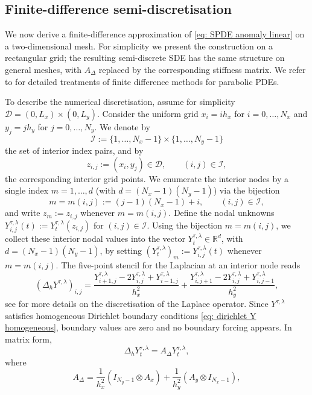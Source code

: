 \documentclass[10pt]{amsart}
\numberwithin{equation}{section}
\begin{document}
\subsection{Finite-difference semi-discretisation}
\label{subsec: fd anomaly}

We now derive a finite-difference approximation of \eqref{eq: SPDE anomaly linear} on a two-dimensional mesh.
For simplicity we present the construction on a rectangular grid; the resulting semi-discrete SDE has the same
structure on general meshes, with $A_\Delta$ replaced by the corresponding stiffness matrix. We refer to \cite{Quarteroni,Leveque} for detailed treatments of finite difference methods for parabolic PDEs.


To describe the numerical discretisation, assume for simplicity $\mathcal D=(0,L_x)\times(0,L_y)$. Consider the uniform grid
$x_i=i h_x$ for $i=0,\dots,N_x$ and $y_j=j h_y$ for $j=0,\dots,N_y$.
We denote by
\[
\mathcal I:=\{1,\dots,N_x-1\}\times\{1,\dots,N_y-1\}
\]
the set of interior index pairs, and by
\[
z_{i,j}:=(x_i,y_j)\in\mathcal D,\qquad (i,j)\in\mathcal I,
\]
the corresponding interior grid points. We enumerate the interior nodes by a single index
$m=1,\dots,d$ (with $d=(N_x-1)(N_y-1)$) via the bijection
\[
m=m(i,j):=(j-1)(N_x-1)+i,
\qquad (i,j)\in\mathcal I,
\]
and write $z_m:=z_{i,j}$ whenever $m=m(i,j)$. Define the nodal unknowns $Y_{i,j} ^{\tau,\lambda}(t):=Y_t^{\tau,\lambda}(z_{i,j})$ for $(i,j)\in\mathcal I$.
Using the bijection $m=m(i,j)$, we collect these interior nodal values into the vector
$Y_t ^{\tau,\lambda}\in\mathbb R^d$, with $d=(N_x-1)(N_y-1)$, by setting $(Y_t ^{\tau,\lambda})_m := Y_{i,j}^{\tau,\lambda}(t)$ whenever $m=m(i,j)$. The five-point stencil for the Laplacian at an interior node reads
$$
(\Delta_h Y^{\tau,\lambda})_{i,j}
=
\frac{Y_{i+1,j}^{\tau,\lambda}-2Y_{i,j}^{\tau,\lambda}+Y_{i-1,j}^{\tau,\lambda}}{h_x^2}
+
\frac{Y_{i,j+1}^{\tau,\lambda}-2Y_{i,j}^{\tau,\lambda}+Y_{i,j-1}^{\tau,\lambda}}{h_y^2},
$$
see \cite[Section 3.2]{Leveque} for more details on the discretisation of the Laplace operator. Since $Y^{\tau,\lambda}$ satisfies homogeneous Dirichlet boundary conditions \eqref{eq: dirichlet Y homogeneous}, boundary
values are zero and no boundary forcing appears. In matrix form,
\begin{equation}
\Delta_h Y_t^{\tau,\lambda} = A_\Delta Y_t^{\tau,\lambda},
\label{eq: discrete laplacian homogeneous}
\end{equation}
where
\begin{equation}
A_\Delta =
\frac{1}{h_x^2}\left(I_{N_y-1}\otimes A_x\right)
+
\frac{1}{h_y^2}\left(A_y\otimes I_{N_x-1}\right),
\label{eq: Adelta kron sum}
\end{equation}
\end{document}
